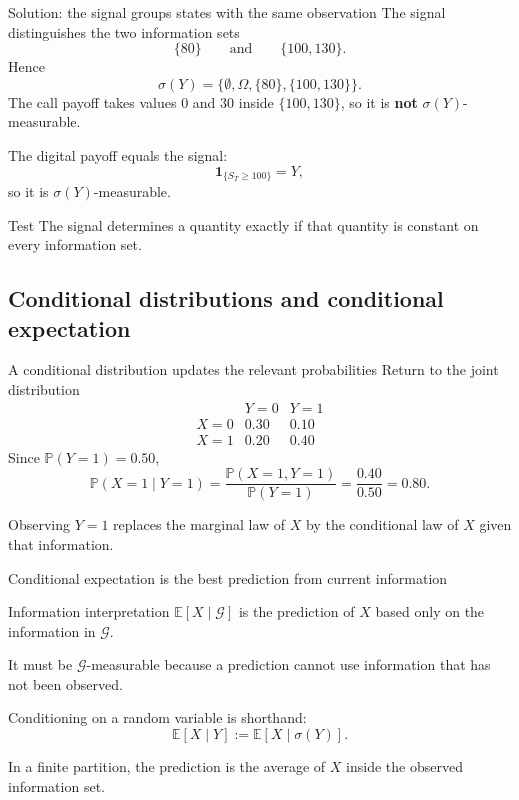 \documentclass[handout,10pt,aspectratio=169]{beamer}
\begin{document}
\begin{frame}{Solution: the signal groups states with the same observation}
The signal distinguishes the two information sets
\[
\{80\}
\qquad\text{and}\qquad
\{100,130\}.
\]
Hence
\[
\sigma(Y)
=\{\emptyset,\Omega,\{80\},\{100,130\}\}.
\]
The call payoff takes values $0$ and $30$ inside $\{100,130\}$, so it is \textbf{not} $\sigma(Y)$-measurable.

The digital payoff equals the signal:
\[
\mathbf 1_{\{S_T\ge100\}}=Y,
\]
so it is $\sigma(Y)$-measurable.

\begin{block}{Test}
The signal determines a quantity exactly if that quantity is constant on every information set.
\end{block}
\end{frame}

\subsection{Conditional distributions and conditional expectation}

\begin{frame}{A conditional distribution updates the relevant probabilities}
Return to the joint distribution
\[
\begin{array}{c|cc}
 & Y=0 & Y=1 \\ \hline
X=0 & 0.30 & 0.10 \\
X=1 & 0.20 & 0.40
\end{array}
\]
Since $\mathbb P(Y=1)=0.50$,
\[
\mathbb P(X=1\mid Y=1)
=\frac{\mathbb P(X=1,Y=1)}{\mathbb P(Y=1)}
=\frac{0.40}{0.50}=0.80.
\]

Observing $Y=1$ replaces the marginal law of $X$ by the conditional law of $X$ given that information.
\end{frame}

\begin{frame}{Conditional expectation is the best prediction from current information}
\begin{block}{Information interpretation}
$\mathbb E[X\mid\mathcal G]$ is the prediction of $X$ based only on the information in $\mathcal G$.
\end{block}

It must be $\mathcal G$-measurable because a prediction cannot use information that has not been observed.

\medskip
Conditioning on a random variable is shorthand:
\[
\mathbb E[X\mid Y]
:=\mathbb E[X\mid\sigma(Y)].
\]

In a finite partition, the prediction is the average of $X$ inside the observed information set.
\end{frame}
\end{document}
